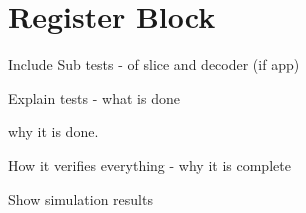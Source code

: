 
\section{Register Block}

Include Sub tests - of slice and decoder (if app)

Explain tests - what is done

why it is done.

How it verifies everything - why it is complete

Show simulation results


